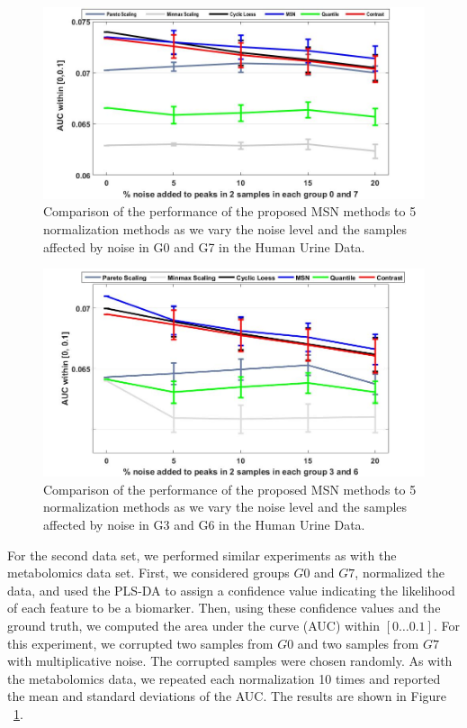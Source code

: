 \begin{figure}
	
	\centering
	\includegraphics[width=1\textwidth]{g0-7_errorbar}
	\caption{Comparison of the performance of the proposed MSN methods to 5 normalization methods as we vary the noise level and the samples affected by noise in G0 and G7 in the Human Urine Data.}
	\label{g07errorbar}
\end{figure}
\begin{figure}
	
	\centering
	\includegraphics[width=1\textwidth]{g3-6_errobar}
	\caption{Comparison of the performance of the proposed MSN methods to 5 normalization methods as we vary the noise level and the samples affected by noise in G3 and G6 in the Human Urine Data.}
	\label{g36errobar}
\end{figure}
For the second data set, we performed similar experiments as with the metabolomics data set. First, we considered groups $G0$ and $G7$, normalized the data, and used the PLS-DA  to assign a confidence value indicating the likelihood of each feature to be a biomarker. Then, using these confidence values and the ground truth, we computed the area under the curve (AUC) within $[0 \ldots 0.1]$. For this experiment, we corrupted two samples from $G0$ and two samples from $G7$ with multiplicative noise. The corrupted samples were chosen randomly. As with the metabolomics data, we repeated each normalization 10 times and reported the mean and standard deviations of the AUC. The results are shown in Figure ~\ref{g07errorbar}.


